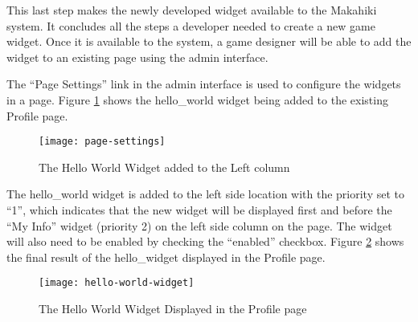 This last step makes the newly developed widget available to the Makahiki system. It concludes all the steps a developer needed to create a new game widget. Once it is available to the system, a game designer will be able to add the widget to an existing page using the admin interface.

The ``Page Settings'' link in the admin interface is used to configure the widgets in a page. Figure \ref{fig:page-settings} shows the hello\_world widget being added to the existing Profile page.

\begin{figure}[!ht]
  \center
  \texttt{[image: page-settings]}
  \caption{The Hello World Widget added to the Left column}
  \label{fig:page-settings}
\end{figure}

The hello\_world widget is added to the left side location with the priority set to ``1'', which indicates that the new widget will be displayed first and before the ``My Info'' widget (priority 2) on the left side column on the page.  The widget will also need to be enabled by checking the ``enabled'' checkbox. Figure \ref{fig:hello-world-widget} shows the final result of the hello\_widget displayed in the Profile page.
\begin{figure}[!ht]
  \center
  \texttt{[image: hello-world-widget]}
  \caption{The Hello World Widget Displayed in the Profile page}
  \label{fig:hello-world-widget}
\end{figure}

